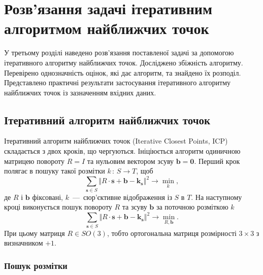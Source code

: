 \chapter{Розв'язання задачі ітеративним алгоритмом найближчих точок}

У третьому розділі наведено розв'язання поставленої задачі за допомогою
ітеративного алгоритму найближчих точок.
Досліджено збіжність алгоритму.
Перевірено однозначність оцінок, які дає алгоритм, та знайдено їх розподіл.
Представлено практичні результати застосування ітеративного алгоритму найближчих
точок із зазначенням вхідних даних.

\section{Ітеративний алгоритм найближчих точок}

Ітеративний алгоритм найближчих точок (Iterative Closest Points, ICP) \cite{icp}
складається з двох кроків, що чергуються.
Ініціюється алгоритм одиничною матрицею повороту $R = I$
та нульовим вектором зсуву $ \boldsymbol{b} = \boldsymbol{0}$.
Перший крок полягає в пошуку такої розмітки $k \, : \, S \to T$, щоб
\begin{equation}\label{eq:labeling}
 \sum \limits_{\boldsymbol{s} \in S}
  \left \Vert R \cdot \boldsymbol{s} + \boldsymbol{b} - \boldsymbol{k_s} \right \Vert^2 \to
  \min \limits_{k},
\end{equation}
де $R$ і $ \boldsymbol{b}$ фіксовані,
$k$~---~сюр'єктивне відображення із $S$ в $T$.
На наступному кроці виконується пошук повороту $R$ та зсуву $ \boldsymbol{b}$
за поточною розміткою $k$
\begin{equation}\label{eq:second:iteration}
 \sum \limits_{\boldsymbol{s} \in S}
  \left \Vert R \cdot \boldsymbol{s} + \boldsymbol{b} - \boldsymbol{k_s} \right \Vert^2
 \to \min \limits_{R, \boldsymbol{b}}.
\end{equation}
При цьому матриця $R \in SO \left( 3 \right) $,
тобто ортогональна матриця розмірності $3 \times 3$ з визначником $+1$.

\subsection{Пошук розмітки}


